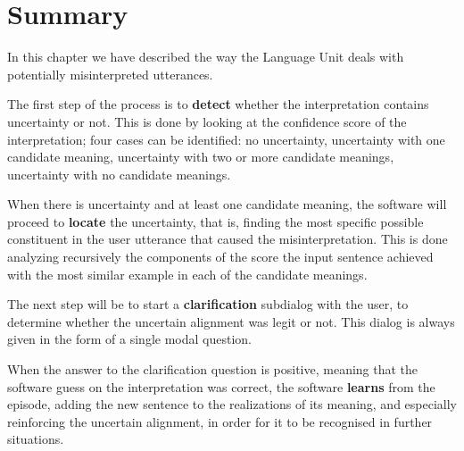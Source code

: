 \section{Summary}
In this chapter we have described the way the Language Unit deals with potentially misinterpreted utterances.

The first step of the process is to \textbf{detect} whether the interpretation contains uncertainty or not. This is done by looking at the confidence score of the interpretation; four cases can be identified: no uncertainty, uncertainty with one candidate meaning, uncertainty with two or more candidate meanings, uncertainty with no candidate meanings.

When there is uncertainty and at least one candidate meaning, the software will proceed to \textbf{locate} the uncertainty, that is, finding the most specific possible constituent in the user utterance that caused the misinterpretation. This is done analyzing recursively the components of the score the input sentence achieved with the most similar example in each of the candidate meanings.

The next step will be to start a \textbf{clarification} subdialog with the user, to determine whether the uncertain alignment was legit or not. This dialog is always given in the form of a single modal question.

When the answer to the clarification question is positive, meaning that the software guess on the interpretation was correct, the software \textbf{learns} from the episode, adding the new sentence to the realizations of its meaning, and especially reinforcing the uncertain alignment, in order for it to be recognised in further situations.